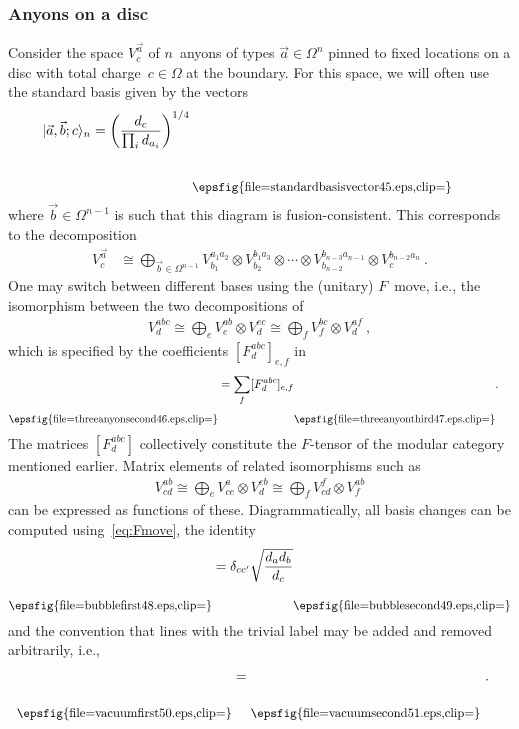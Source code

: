 \documentclass[floats,prb,twocolumn]{revtex4}
\newcommand*{\textfrac}[2]{{{#1}/{#2}}}
\newcommand{\ket}[1]{|#1\rangle}
\newcommand*{\standardbasisvector}{\raisebox{-44.523pt}{\epsfig{file=standardbasisvector45.eps,clip=}}}
\newcommand*{\threeanyonsecond}{\raisebox{-31.806pt}{\epsfig{file=threeanyonsecond46.eps,clip=}}}
\newcommand*{\threeanyonthird}{\raisebox{-31.806pt}{\epsfig{file=threeanyonthird47.eps,clip=}}}
\newcommand*{\bubblefirst}{\raisebox{-31.806pt}{\epsfig{file=bubblefirst48.eps,clip=}}}
\newcommand*{\bubblesecond}{\raisebox{-31.806pt}{\epsfig{file=bubblesecond49.eps,clip=}}}
\newcommand*{\vacuumfirst}{\raisebox{-28.926pt}{\epsfig{file=vacuumfirst50.eps,clip=}}}
\newcommand*{\vacuumsecond}{\raisebox{-28.926pt}{\epsfig{file=vacuumsecond51.eps,clip=}}}
\begin{document}
\subsubsection{Anyons on a disc}
Consider the space $V^{\vec{a}}_c$  of $n$~anyons of types $\vec{a}\in\Omega^n$
pinned to fixed locations on a disc with total charge~$c\in\Omega$ at the boundary. For this space,  we will often use the standard basis
 given by the vectors
\begin{align}
\hspace{-1ex}\ket{\vec{a},\vec{b};c}_n&=\left(\frac{d_c}{\prod_i d_{a_i}}\right)^{\textfrac{1}{4}}\scalebox{0.9}{\standardbasisvector}\  \label{eq:standardbasis}
\end{align}
where   $\vec{b}\in\Omega^{n-1}$  is such that this diagram is fusion-consistent. This corresponds to the decomposition
\begin{align*}
V^{\vec{a}}_c &\cong \bigoplus_{\vec{b}\in\Omega^{n-1}} V^{a_1a_2}_{b_1}\otimes V^{b_1a_3}_{b_2}\otimes\cdots\otimes V^{b_{n-3}a_{n-1}}_{b_{n-2}}\otimes V^{b_{n-2}a_n}_c\ .
\end{align*}
One may switch between different bases using the (unitary) $F$~move, i.e., the isomorphism between the two decompositions of 
\begin{align*}
V^{abc}_d \cong \bigoplus_{e}V^{ab}_e\otimes V^{ec}_d\cong \bigoplus_f V^{bc}_f\otimes V^{af}_d\ ,
\end{align*}
which is specified by the coefficients $[F^{abc}_d]_{e,f}$ in
\begin{align}
\scalebox{0.9}{\threeanyonsecond} &=\sum_{f} [F^{abc}_d]_{e,f}\scalebox{0.9}{\threeanyonthird} .\label{eq:Fmove}
\end{align}
The matrices $[F^{abc}_d]$ collectively constitute the $F$-tensor of the modular category mentioned earlier.
Matrix elements of related isomorphisms such as
\begin{align*}
V^{ab}_{cd}\cong\bigoplus_e V_{ce}^a\otimes V_{d}^{eb}\cong \bigoplus_{f}V^{f}_{cd}\otimes V^{ab}_f
\end{align*}
can be expressed as functions of these. Diagrammatically, all basis changes can be computed using~\eqref{eq:Fmove}, the identity
\begin{align}
\scalebox{0.9}{\bubblefirst}=\delta_{cc'}\sqrt{\frac{d_ad_b}{d_c}}\scalebox{0.9}{\bubblesecond}\label{eq:bubbleremoval}
\end{align}
and the convention that lines with the trivial label may be added and removed arbitrarily, i.e.,
\begin{align}
\scalebox{0.9}{\vacuumfirst} &=\scalebox{0.9}{\vacuumsecond}\ .\label{eq:vacuumlineaddition}
\end{align}
\end{document}
